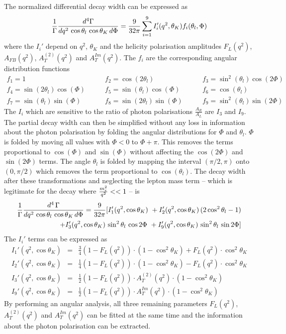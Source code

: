 The normalized differential decay width can be expressed as
\begin{equation}
\frac{1}{\Gamma}\frac{d^4 \Gamma}{dq^2 \, \cos{\theta_l} \, \cos{\theta_K} \, d\Phi} = \frac{9}{32 \pi}\sum_{i=1}^{9} I_i'(q^2, \theta_K) f_i(\theta_l , \Phi)
\end{equation}
where the $I_i'$ depend on $q^2$, $\theta_K$ and the helicity polarisation amplitudes $F_L(q^2)$, $A_{FB}(q^2)$, $A^{(2)}_T(q^2)$ and $A^{Im}_T(q^2)$. The $f_i$ are the corresponding angular distribution functions
\begin{eqnarray}
f_1 = 1 \qquad & f_2 = \cos(2\theta_l) \qquad & f_3 = \sin^2(\theta_l) \cos(2\Phi)\nonumber\\
f_4 = \sin(2\theta_l) \cos(\Phi) \qquad & f_5 = \sin(\theta_l) \cos(\Phi) \qquad & f_6 = \cos(\theta_l)\\
f_7 = \sin(\theta_l)\sin(\Phi) \qquad & f_8 = \sin(2\theta_l)\sin(\Phi)\qquad & f_9 = \sin^2(\theta_l)\sin(2\Phi)\nonumber
\end{eqnarray}
The $I_i$ which are sensitive to the ratio of photon polarisations $\frac{A_R}{A_L}$ are $I_3$ and $I_9$. The partial decay width can then be simplified without any loss in information about the photon polarisation by folding the angular distributions for $\Phi$ and $\theta_l$. $\Phi$ is folded by moving all values with $\Phi <0$ to $\Phi + \pi$. This removes the terms proportional to $\cos(\Phi)$ and $\sin(\Phi)$ without affecting the $\cos(2\Phi)$ and $\sin(2\Phi)$ terms. The angle $\theta_l$ is folded by mapping the interval $(\pi /2, \pi)$ onto $(0, \pi /2)$ which removes the term proportional to $\cos(\theta_l)$. 
The decay width after these transformations and neglecting the lepton mass term -- which is legitimate for the \BdKstee decay where $\frac{m^2_{e}}{q^2} << 1$ -- is
 \begin{eqnarray}
 \frac{1}{\Gamma}\frac{d^4\, \Gamma}{dq^2 \, \ctl \, \ctk \, d\Phi} = \frac{9}{32 \pi} [  I_1'(q^2, \cos\theta_K)\ +   I_2'(q^2, \cos\theta_K)\, (2\cos^2\theta_l -1) \nonumber \\
  +  I_3'(q^2, \cos\theta_K)\, \sin^2\theta_l \, \cos2\Phi \ +  I_9'(q^2, \cos\theta_K)\, \sin^2\theta_l \, \sin2\Phi ]
 \label{eq:partw}
 \end{eqnarray}
The $I_i'$ terms can be expressed as
\begin{eqnarray}
 I_1'(q^2, \cos\theta_K) &=& \frac{3}{4} (1-F_L(q^2)) \cdot (1-\cos^2\theta_K) + F_L(q^2) \cdot \cos^2\theta_K \nonumber \\
 I_2'(q^2, \cos\theta_K) &=& \frac{1}{4} (1-F_L(q^2)) \cdot (1-\cos^2\theta_K) - F_L(q^2) \cdot \cos^2\theta_K \nonumber \\
 I_3'(q^2, \cos\theta_K) &=& \frac{1}{2} (1-F_L(q^2)) \cdot A^{(2)}_T(q^2) \cdot (1 - \cos^2\theta_K)   \label{eq:is} \\
   I_9'(q^2, \cos\theta_K) &=& \frac{1}{2} (1-F_L(q^2)) \cdot A^{Im}_T(q^2) \cdot (1 - \cos^2\theta_K)  \nonumber 
\end{eqnarray}
By performing an angular analysis, all three remaining parameters $F_L(q^2)$, $A^{(2)}_T(q^2)$ and $A^{Im}_T(q^2)$ can be fitted at the same time and the information about the photon polarisation can be extracted. \\

